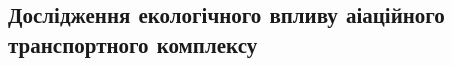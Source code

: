% 
% 
% 
% 
% 
% 

\subsection{Дослідження екологічного впливу аіаційного транспортного комплексу}

